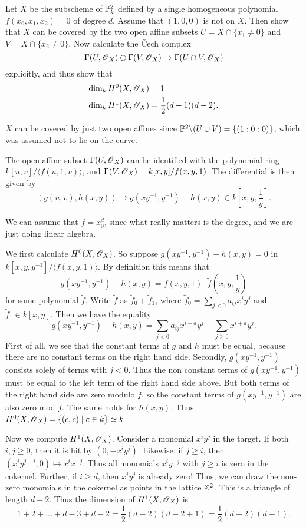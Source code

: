 \documentclass[11pt, english]{article}
\begin{document}
\begin{exc}[Exercise 4.7]
Let $X$ be the subscheme of $\mathbb{P}_k^2$ defined by a single homogeneous polynomial $f(x_0,x_1,x_2)=0$ of degree $d$. Assume that $(1,0,0)$ is not on $X$. Then show that $X$ can be covered by the two open affine subsets $U= X \cap \{ x_1 \neq 0\}$ and $V = X \cap \{ x_2 \neq 0\}$. Now calculate the \v Cech complex
\[
\Gamma(U,\operatorname{\mathscr{O}}_X) \oplus \Gamma(V,\operatorname{\mathscr{O}}_X) \to \Gamma(U \cap V, \operatorname{\mathscr{O}}_X)
\]
explicitly, and thus show that
\begin{align*}
  \dim_k H^0(X,\operatorname{\mathscr{O}}_X) &= 1 \\
\dim _k H^1(X,\operatorname{\mathscr{O}}_X) &= \frac 12 (d-1)(d-2).
\end{align*}
\end{exc}

\begin{sol}
 $X$ can be covered by just two open affines since $\mathbb{P}^2 \backslash (U \cup V) = \{(1:0:0)\}$, which was assumed not to lie on the curve.

The open affine subset $\Gamma(U, \operatorname{\mathscr{O}}_X)$ can be identified with the polynomial ring $k[u,v]/\langle f(u,1,v) \rangle$, and $\Gamma(V,\operatorname{\mathscr{O}}_X) = k[x,y]/f(x,y,1)$. The differential is then given by 
\[
\left( g(u,v), h(x,y) \right) \mapsto g(xy^{-1},y^{-1})-h(x,y) \in k[x,y,\frac 1y].
\]

We can assume that $f=x_0^d$, since what really matters is the degree, and we are just doing linear algebra.

We first calculate $H^0(X,\operatorname{\mathscr{O}}_X)$. So suppose $g(xy^{-1}, y^{-1})-h(x,y)=0$ in $k[x,y,y^{-1}]/\langle f(x,y,1) \rangle$. By definition this means that
\[
g(xy^{-1},y^{-1}) - h(x,y) = f(x,y,1) \cdot \tilde f(x,y,\frac 1y)
\]
for some polynomial $\tilde f$. Write $\tilde f$ as $\tilde f_0 + \tilde f_1$, where $\tilde f_0=\sum_{j < 0} a_{ij} x^i y^j$ and $\tilde f_1 \in k[x,y]$. Then we have the equality
\[
g(xy^{-1},y^{-1}) - h(x,y) = \sum_{j < 0} a_{ij}x^{i+d}y^j + \sum_{j \geq 0} x^{i+d} y^j.
\]
First of all, we see that the constant terms of $g$ and $h$ must be equal, because there are no constant terms on the right hand side. Secondly, $g(xy^{-1},y^{-1})$ consists solely of terms with $j < 0$. Thus the non constant terms of  $g(xy^{-1},y^{-1})$ must be equal to the left term of the right hand side above. But both terms of the right hand side are zero modulo $f$, so the constant terms of $g(xy^{-1},y^{-1})$ are also zero mod $f$. The same holds for $h(x,y)$. Thus $H^0(X,\operatorname{\mathscr{O}}_X)= \{ (c,c) \mid c \in k \} \simeq k$.

Now we compute $H^1(X,\operatorname{\mathscr{O}}_X)$. Consider a monomial $x^iy^j$ in the target. If both $i,j \geq 0$, then it is hit by $(0,-x^iy^j)$. Likewise, if $j \geq i$, then $(x^iy^{j-i},0) \mapsto x^i x^{-j}$. Thus all monomials $x^iy^{-j}$ with $j \geq i$ is zero in the cokernel. Further, if $i \geq d$, then $x^i y^j$ is already zero! Thus, we can draw the non-zero monomials in the cokernel as points in the lattice $\mathbb{Z}^2$. This is a triangle of length $d-2$. Thus the dimension of $H^1(X,\operatorname{\mathscr{O}}_X)$ is 
\[
1 + 2 + \ldots+ d-3 + d-2 = \frac 12 (d-2)(d-2+1) = \frac 12 (d-2)(d-1).
\]
\end{sol}
\end{document}
